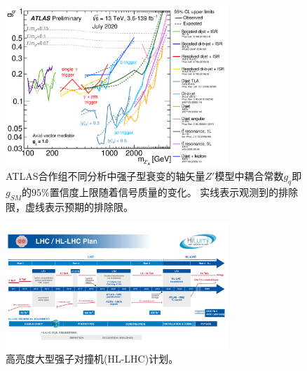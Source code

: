 \begin{figure}
  \begin{center}
    \includegraphics[width=0.75\textwidth]{figuresEND/ZPRIME.png}
  \end{center}
  \caption{ 
  ATLAS合作组不同分析中强子型衰变的轴矢量$Z'$模型中耦合常数$g_q$即$g_{SM}$的$95\%$置信度上限随着信号质量的变化。
  实线表示观测到的排除限，虚线表示预期的排除限。
   }
    \label{fig:ENDING3}
\end{figure}



\begin{figure}
  \begin{center}
    \includegraphics[width=0.75\textwidth]{figuresEND/HLLHC.pdf}
  \end{center}
  \caption{
高亮度大型强子对撞机(HL-LHC)计划。
  }
    \label{fig:HLLHC}
\end{figure}



